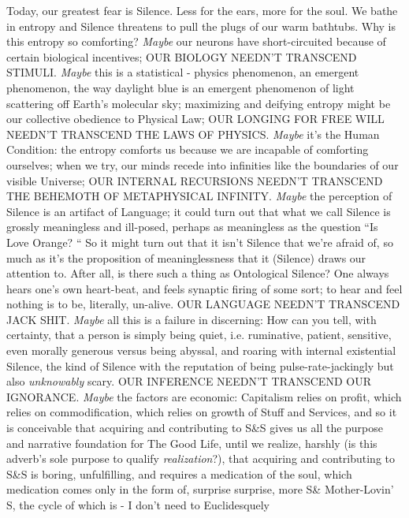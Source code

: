 \documentclass{article}
\begin{document}
\newline

Today, our greatest fear is Silence. Less for the ears, more for the
soul. We bathe in entropy and Silence threatens to pull the plugs of our
warm bathtubs. Why is this entropy so comforting? \textit{Maybe} our
neurons have short-circuited because of certain biological incentives;
OUR BIOLOGY NEEDN'T TRANSCEND STIMULI. \textit{Maybe} this is
a statistical - physics phenomenon, an emergent phenomenon, the way
daylight blue is an emergent phenomenon of light scattering off Earth's
molecular sky; maximizing and deifying entropy might be our collective
obedience to Physical Law; OUR LONGING FOR FREE WILL NEEDN'T TRANSCEND
THE LAWS OF PHYSICS. \textit{Maybe} it's the Human Condition: the
entropy comforts us because we are incapable of comforting ourselves;
when we try, our minds recede into infinities like the boundaries of our
visible Universe; OUR INTERNAL RECURSIONS NEEDN'T TRANSCEND THE BEHEMOTH
OF METAPHYSICAL INFINITY. \textit{Maybe} the perception of Silence is an
artifact of Language; it could turn out that what we call Silence is
grossly meaningless and ill-posed, perhaps as meaningless as the
question ``Is Love Orange? `` So it might turn out that it isn't Silence
that we're afraid of, so much as it's the proposition of meaninglessness
that it (Silence) draws our attention to. After all, is there such
a thing as Ontological Silence? One always hears one's own heart-beat,
and feels synaptic firing of some sort; to hear and feel nothing is to
be, literally, un-alive. OUR LANGUAGE NEEDN'T TRANSCEND JACK SHIT.
\textit{Maybe} all this is a failure in discerning: How can you tell,
with certainty, that a person is simply being quiet, i.e. ruminative,
patient, sensitive, even morally generous versus being abyssal, and
roaring with internal existential Silence, the kind of Silence with the
reputation of being pulse-rate-jackingly but also \textit{unknowably}
scary. OUR INFERENCE NEEDN'T TRANSCEND OUR IGNORANCE. \textit{Maybe} the
factors are economic: Capitalism relies on profit, which relies on
commodification, which relies on growth of Stuff and Services, and so it
is conceivable that acquiring and contributing to S\&S gives us all the
purpose and narrative foundation for The Good Life, until we realize,
harshly (is this adverb's sole purpose to qualify
\textit{realization}?), that acquiring and contributing to S\&S is
boring, unfulfilling, and requires a medication of the soul, which
medication comes only in the form of, surprise surprise, more S\&
Mother-Lovin' S, the cycle of which is - I don't need to Euclidesquely
\end{document}
